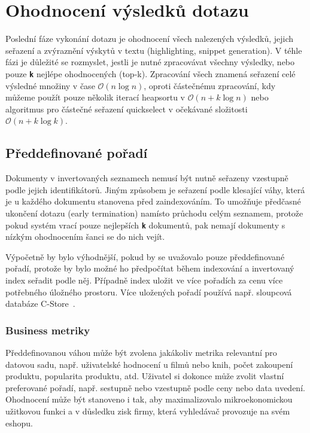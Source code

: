 \documentclass[11pt,letterpaper,oneside,openright]{book}
\newcommand{\bftt}[1]{\texttt{\textbf{#1}}}
\begin{document}

\section{Ohodnocení výsledků dotazu} \label{sec:ohodnoceni_vysledku}
Poslední fáze vykonání dotazu je ohodnocení všech nalezených výsledků, jejich
seřazení a zvýraznění výskytů v textu (highlighting, snippet generation). V
téhle fázi je důležité se rozmyslet, jestli je nutné zpracovávat všechny
výsledky, nebo pouze \bftt{k} nejlépe ohodnocených (top-k). Zpracování všech
znamená seřazení celé výsledné množiny v čase $\mathcal{O}(n \log n)$, oproti
částečnému zpracování, kdy můžeme použít pouze několik iterací heapsortu v
$\mathcal{O}(n + k \log n)$ nebo algoritmus pro částečné seřazení quickselect v
očekávané složitosti $\mathcal{O}(n + k \log k)$.

\subsection{Předdefinované pořadí}
Dokumenty v invertovaných seznamech nemusí být nutně seřazeny vzestupně podle
jejich identifikátorů. Jiným způsobem je seřazení podle klesající váhy, která
je u každého dokumentu stanovena před zaindexováním. To umožňuje předčasné
ukončení dotazu (early termination) namísto průchodu celým seznamem, protože
pokud systém vrací pouze nejlepších \bftt{k} dokumentů, pak nemají dokumenty s
nízkým ohodnocením šanci se do nich vejít.

Výpočetně by bylo výhodnější, pokud by se uvažovalo pouze předdefinované
pořadí, protože by bylo možné ho předpočítat během indexování a invertovaný
index seřadit podle něj. Případně index uložit ve více pořadích za cenu více
potřebného úložného prostoru. Více uložených pořadí používá např. sloupcová
databáze C-Store~\cite{Stonebraker:2005:CCD:1083592.1083658}.

\subsubsection{Business metriky}
Předdefinovanou váhou může být zvolena jakákoliv metrika relevantní pro datovou
sadu, např. uživatelské hodnocení u filmů nebo knih, počet zakoupení produktu,
popularita produktu, atd. Uživatel si dokonce může zvolit vlastní preferované
pořadí, např. sestupně nebo vzestupně podle ceny nebo data uvedení. Ohodnocení
může být stanoveno i tak, aby maximalizovalo mikroekonomickou užitkovou funkci
a v důsledku zisk firmy, která vyhledávač provozuje na svém eshopu.
\end{document}
